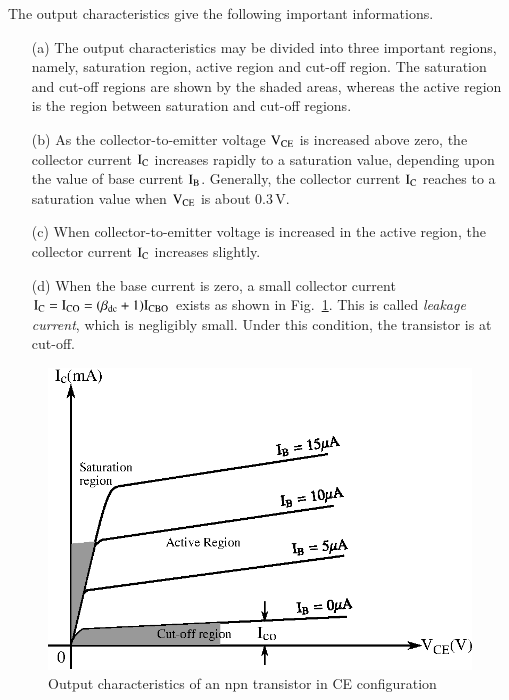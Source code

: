 \smallskip
The output characteristics give the following important informations.
\begin{itemize}
\item[(a)] The output characteristics may be divided into three important regions, namely, saturation region, active region and cut-off region. The saturation and cut-off regions are shown by the shaded areas, whereas the active region is the region between saturation and cut-off regions.

\newpage

\item[(b)] As the collector-to-emitter voltage $\textrm{V}_{\text{CE}}$ is increased above zero, the collector current $\textrm{I}_{\textrm{C}}$ increases rapidly to a saturation value, depending upon the value of base current $\textrm{I}_{\textrm{B}}$. Generally, the collector current $\textrm{I}_{\textrm{C}}$ reaches to a saturation value when $\textrm{V}_{\text{CE}}$ is about 0.3\,V.

\item[(c)] When collector-to-emitter voltage is increased in the active region, the collector current $\textrm{I}_{\textrm{C}}$ increases slightly.

\item[(d)] When the base current is zero, a small collector current $\textrm{I}_{\textrm{C}}=\textrm{I}_{\text{CO}}=(\beta_{\text{dc}}+1)\textrm{I}_{\text{CBO}}$ exists as shown in Fig.~\ref{fig2.16}. This is called {\em leakage current}, which is negligibly small. Under this condition, the transistor is at cut-off.
\end{itemize}
\begin{figure}[H]
\centering
\includegraphics{chap2/fig16.eps}
\caption{Output characteristics of an npn transistor in CE configuration}\label{fig2.16}
\end{figure}




